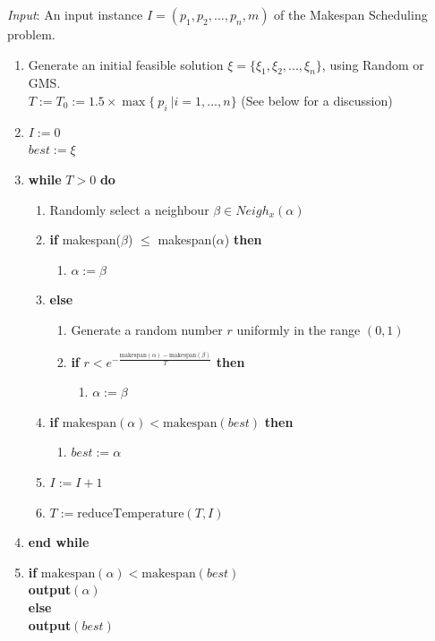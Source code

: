 \documentclass[12pt,a4paper,reqno]{article}
\begin{document}
\emph{Input}: An input instance $I = (p_1,p_2,...,p_n,m)$ of the Makespan Scheduling problem.
\begin{enumerate}
\item Generate an initial feasible solution $\xi = \{\xi_1,\xi_2,...,\xi_n\}$, using Random or GMS. \\
$T := T_0 := 1.5 \times \max\{ \> p_i \>  | i = 1,...,n \}$ (See below for a discussion)
\item $I := 0$ \\
$best:=\xi$
\item\textbf{while} $T>0$ \textbf{do}
\begin{enumerate}
\item Randomly select a neighbour $\beta\in Neigh_x(\alpha)$
\item \textbf{if} makespan($\beta$) $\leq$ makespan($\alpha$) \textbf{then}
\begin{enumerate}
\item $\alpha:=\beta$
\end{enumerate}
\item[] \textbf{else}
\begin{enumerate}
\item Generate a random number $r$ uniformly in the range $(0,1)$
\item \textbf{if} $r<e^{-\frac{\text{makespan}(\alpha)-\text{makespan}(\beta)}{T}}$ \textbf{then}
\begin{enumerate}
\item[] $\alpha:=\beta$
\end{enumerate}
\end{enumerate}
\item \textbf{if}
$\text{makespan}(\alpha) < \text{makespan}(best)$ \textbf{then}
\begin{enumerate}
\item[] $best:=\alpha$
\end{enumerate}
\item $I:=I+1$
\item $T:=\text{reduceTemperature}(T,I)$
\end{enumerate}
\item[] \textbf{end while}
\item \textbf{if} $\text{makespan}(\alpha) < \text{makespan}(best)$ \\
\indent \textbf{output}$(\alpha)$ \\
\textbf{else} \\
\indent \textbf{output}$(best)$
\end{enumerate}
\end{document}
